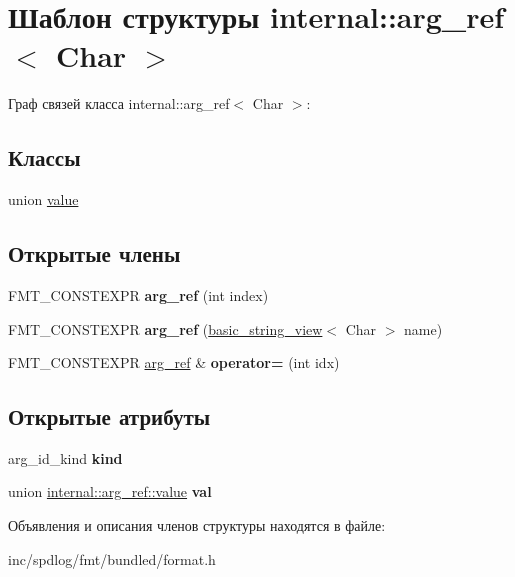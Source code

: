 \hypertarget{structinternal_1_1arg__ref}{}\section{Шаблон структуры internal\+:\+:arg\+\_\+ref$<$ Char $>$}
\label{structinternal_1_1arg__ref}


Граф связей класса internal\+:\+:arg\+\_\+ref$<$ Char $>$\+:
\subsection*{Классы}
\begin{DoxyCompactItemize}
\item 
union \hyperlink{unioninternal_1_1arg__ref_1_1value}{value}
\end{DoxyCompactItemize}
\subsection*{Открытые члены}
\begin{DoxyCompactItemize}
\item 
\mbox{\label{structinternal_1_1arg__ref_a945638551b5a8945089391fb269505d6}} 
F\+M\+T\+\_\+\+C\+O\+N\+S\+T\+E\+X\+PR {\bfseries arg\+\_\+ref} (int index)
\item 
\mbox{\label{structinternal_1_1arg__ref_a1f32add2cf456ff37eb9289fb419ec21}} 
F\+M\+T\+\_\+\+C\+O\+N\+S\+T\+E\+X\+PR {\bfseries arg\+\_\+ref} (\hyperlink{classbasic__string__view}{basic\+\_\+string\+\_\+view}$<$ Char $>$ name)
\item 
\mbox{\label{structinternal_1_1arg__ref_a98bc592791dedaad725d099b4a82bf7f}} 
F\+M\+T\+\_\+\+C\+O\+N\+S\+T\+E\+X\+PR \hyperlink{structinternal_1_1arg__ref}{arg\+\_\+ref} \& {\bfseries operator=} (int idx)
\end{DoxyCompactItemize}
\subsection*{Открытые атрибуты}
\begin{DoxyCompactItemize}
\item 
\mbox{\label{structinternal_1_1arg__ref_a742f3d517e81ba14d41f19299c6e1a62}} 
arg\+\_\+id\+\_\+kind {\bfseries kind}
\item 
\mbox{\label{structinternal_1_1arg__ref_a23e079c1a6968b1a7643e3f94c4f0fb3}} 
union \hyperlink{unioninternal_1_1arg__ref_1_1value}{internal\+::arg\+\_\+ref\+::value} {\bfseries val}
\end{DoxyCompactItemize}


Объявления и описания членов структуры находятся в файле\+:\begin{DoxyCompactItemize}
\item 
inc/spdlog/fmt/bundled/format.\+h\end{DoxyCompactItemize}
